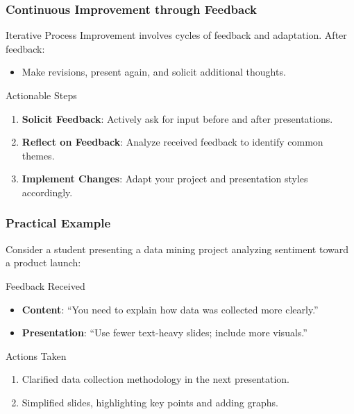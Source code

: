 \documentclass[aspectratio=169]{beamer}
\begin{document}
\begin{frame}[fragile]
    \frametitle{Continuous Improvement through Feedback}
    \begin{block}{Iterative Process}
        Improvement involves cycles of feedback and adaptation. After feedback:
        \begin{itemize}
            \item Make revisions, present again, and solicit additional thoughts.
        \end{itemize}
    \end{block}
    
    \begin{block}{Actionable Steps}
        \begin{enumerate}
            \item \textbf{Solicit Feedback}: Actively ask for input before and after presentations.
            \item \textbf{Reflect on Feedback}: Analyze received feedback to identify common themes.
            \item \textbf{Implement Changes}: Adapt your project and presentation styles accordingly.
        \end{enumerate}
    \end{block}
\end{frame}

\begin{frame}[fragile]
    \frametitle{Practical Example}
    Consider a student presenting a data mining project analyzing sentiment toward a product launch:
    \begin{block}{Feedback Received}
        \begin{itemize}
            \item \textbf{Content}: “You need to explain how data was collected more clearly.”
            \item \textbf{Presentation}: “Use fewer text-heavy slides; include more visuals.”
        \end{itemize}
    \end{block}
    
    \begin{block}{Actions Taken}
        \begin{enumerate}
            \item Clarified data collection methodology in the next presentation.
            \item Simplified slides, highlighting key points and adding graphs.
        \end{enumerate}
    \end{block}
\end{frame}
\end{document}
